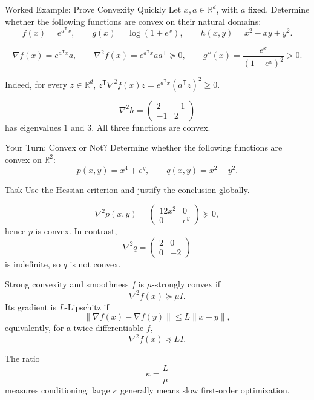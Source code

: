 \documentclass[aspectratio=169,11pt]{beamer}
\newcommand{\R}{\mathbb{R}}
\newcommand{\trans}{^{\mathsf T}}
\newcommand{\grad}{\nabla}
\begin{document}
\begin{frame}{Worked Example: Prove Convexity Quickly}
  Let $x,a\in\R^d$, with $a$ fixed. Determine whether the following functions
  are convex on their natural domains:
  \[
    f(x)=e^{a\trans x},
    \qquad
    g(x)=\log(1+e^x),
    \qquad
    h(x,y)=x^2-xy+y^2.
  \]

  \pause
  \[
    \grad f(x)=e^{a\trans x}a,
    \qquad
    \grad^2f(x)=e^{a\trans x}aa\trans\succeq0,
    \qquad
    g''(x)=\frac{e^x}{(1+e^x)^2}>0.
  \]

  Indeed, for every $z\in\R^d$,
  $z\trans\grad^2f(x)z=e^{a\trans x}(a\trans z)^2\geq0$.

  \pause
  \[
    \grad^2h=\begin{pmatrix}2&-1\\-1&2\end{pmatrix}
  \]
  has eigenvalues $1$ and $3$. All three functions are convex.
\end{frame}

\begin{frame}{Your Turn: Convex or Not?}
  Determine whether the following functions are convex on $\R^2$:
  \[
    p(x,y)=x^4+e^y,
    \qquad
    q(x,y)=x^2-y^2.
  \]

  \begin{exampleblock}{Task}
    Use the Hessian criterion and justify the conclusion globally.
  \end{exampleblock}

  \pause
  \[
    \grad^2p(x,y)=\begin{pmatrix}12x^2&0\\0&e^y\end{pmatrix}\succeq0,
  \]
  hence $p$ is convex. In contrast,
  \[
    \grad^2q=\begin{pmatrix}2&0\\0&-2\end{pmatrix}
  \]
  is indefinite, so $q$ is not convex.
\end{frame}

\begin{frame}{Strong convexity and smoothness}
  $f$ is $\mu$-strongly convex if
  \[
    \grad^2f(x)\succeq \mu I.
  \]
  Its gradient is $L$-Lipschitz if
  \[
    \|\grad f(x)-\grad f(y)\|\leq L\|x-y\|,
  \]
  equivalently, for a twice differentiable $f$,
  \[
    \grad^2f(x)\preceq LI.
  \]

  The ratio
  \[
    \kappa=\frac{L}{\mu}
  \]
  measures conditioning: large $\kappa$ generally means slow first-order optimization.
\end{frame}
\end{document}
